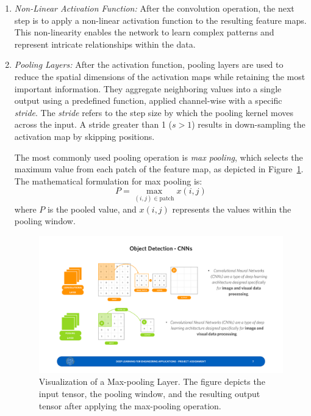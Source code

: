 \begin{enumerate}
    \item \textit{Non-Linear Activation Function:} After the convolution operation, the next step is to apply a non-linear activation function to the resulting feature maps. This non-linearity enables the network to learn complex patterns and represent intricate relationships within the data. 

    \item \textit{Pooling Layers:} After the activation function, pooling layers are used to reduce the spatial dimensions of the activation maps while retaining the most important information. They aggregate neighboring values into a single output using a predefined function, applied channel-wise with a specific \textit{stride}. The \textit{stride} refers to the step size by which the pooling kernel moves across the input. A stride greater than 1 (\( s > 1 \)) results in down-sampling the activation map by skipping positions.
    
    The most commonly used pooling operation is \textit{max pooling}, which selects the maximum value from each patch of the feature map, as depicted in Figure~\ref{fig:cnn-pooling}. The mathematical formulation for max pooling is:
    \begin{equation}
        P = \max_{(i,j) \in \text{patch}} x(i,j)
    \end{equation}
    where \( P \) is the pooled value, and \( x(i,j) \) represents the values within the pooling window.
    
    \begin{minipage}{\linewidth}
    \begin{figure}[H]
        \centering
        \includegraphics[width=0.85\linewidth]{LateX//figs/CNN_poolinh.pdf}
        \caption{Visualization of a Max-pooling Layer. The figure depicts the input tensor, the pooling window, and the resulting output tensor after applying the max-pooling operation.}
        \label{fig:cnn-pooling}
    \end{figure}
    \end{minipage}
    \vspace{0.25 cm}
    

\end{enumerate}
